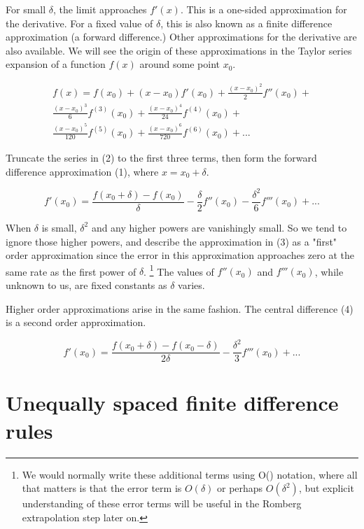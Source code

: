 \documentclass[a4paper,11pt]{article}
\begin{document}
For small $\delta$, the limit approaches $f'(x)$. This is a one-sided approximation for
the derivative. For a fixed value of $\delta$, this is also known as a finite difference
approximation (a forward difference.) Other approximations for the derivative are also
available. We will see the origin of these approximations in the Taylor series expansion
of a function $f(x)$ around some point $x_0$.

\begin{multline} \tag{2}
   f(x) = f(x_0) + (x - x_0)f'(x_0) + \frac{(x - x_0)^2}{2} f''(x_0) + \\
   \frac{(x - x_0)^3}{6} f^{(3)}(x_0) + \frac{(x - x_0)^4}{24} f^{(4)}(x_0) + \\
   \frac{(x - x_0)^5}{120} f^{(5)}(x_0) + \frac{(x - x_0)^6}{720} f^{(6)}(x_0) +...
\end{multline}

Truncate the series in (2) to the first three terms, then form the forward difference
approximation (1), where $x = x_0 + \delta$.

\begin{equation} \tag{3}
   f'(x_0) = \frac{f(x_0+\delta) - f(x_0)}{\delta} - \frac{\delta}{2} f''(x_0) - \frac{\delta^2}{6} f'''(x_0) + ...
\end{equation}

When $\delta$ is small, $\delta^2$ and any higher powers are vanishingly small. So we tend
to ignore those higher powers, and describe the approximation in (3) as a "first" order
approximation since the error in this approximation approaches zero at the same rate as the first power of $\delta$. \footnote{We would normally write these additional terms using O() notation, where all that matters is that the error term is $O(\delta)$ or perhaps $O(\delta^2)$, but explicit understanding of these error terms will be useful in the Romberg extrapolation step later on.} The values of $f''(x_0)$ and $f'''(x_0)$, while unknown to us, are fixed constants as $\delta$ varies.

Higher order approximations arise in the same fashion. The central difference (4) is a second
order approximation.

\begin{equation} \tag{4}
   f'(x_0) = \frac{f(x_0+\delta) - f(x_0-\delta)}{2\delta} - \frac{\delta^2}{3} f'''(x_0) + ...
\end{equation}


\bigskip

\section{Unequally spaced finite difference rules}
\end{document}

